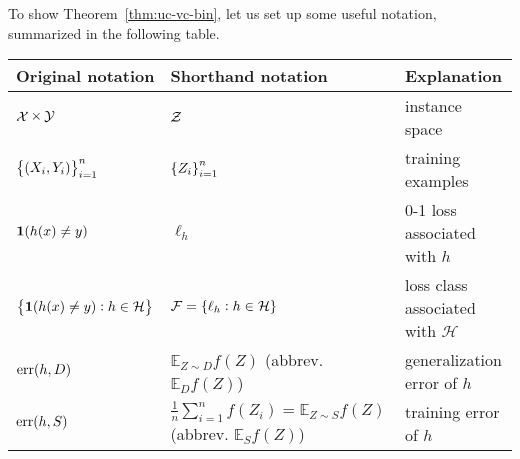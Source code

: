 \documentclass{article}
\DeclareMathOperator*{\err}{{\rm err}}
\DeclareMathOperator*{\Xcal}{{\cal X}}
\DeclareMathOperator*{\Ycal}{{\cal Y}}
\DeclareMathOperator*{\Zcal}{{\cal Z}}
\newcommand{\EE}{\mathbb{E}}
\newcommand{\Hcal}{\mathcal{H}}
\newcommand{\Fcal}{\mathcal{F}}
\newcommand*{\one}{{\bf 1}}
\begin{document}
To show Theorem~\ref{thm:uc-vc-bin}, let us set up some useful notation, summarized
in the following table.

\begin{table}[H]
\begin{tabular}{|l|l|l|}
\hline
Original notation & Shorthand notation & Explanation\\
\hline
$\Xcal \times \Ycal$ & $\Zcal$ & instance space\\
$\cbr{(X_i, Y_i)}_{i=1}^n$ & $\cbr{Z_i}_{i=1}^n$ & training examples \\
$\one(h(x) \neq y)$ & $\ell_h$ & 0-1 loss associated with $h$\\
$\cbr{\one(h(x) \neq y): h \in \Hcal}$ & $\Fcal = \cbr{\ell_h: h \in \Hcal}$ & loss class associated with $\Hcal$\\
$\err(h,D)$ & $\EE_{Z \sim D} f(Z)$ (abbrev. $\EE_D f(Z)$) & generalization error of $h$\\
$\err(h,S)$ & $\frac{1}{n} \sum_{i=1}^n f(Z_i) = \EE_{Z \sim S} f(Z)$ (abbrev. $\EE_S f(Z)$) & training error of $h$ \\
\hline
\end{tabular}
\label{table:notation}
\end{table}
\end{document}
